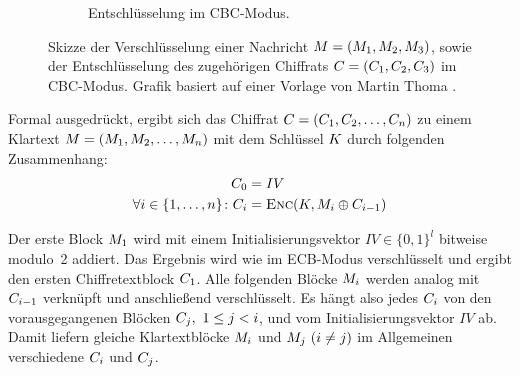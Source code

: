 \begin{figure}[h]
\begin{subfigure}[h]{.45\textwidth}
    \caption{Entschlüsselung im CBC-Modus.}
  \end{subfigure}
  \caption{Skizze der Verschlüsselung einer Nachricht $M =
    (M_{1},M_{2},M_{3})$, sowie der Entschlüsselung
    des zugehörigen Chiffrats $C =
    (C_{1},C_{2},C_{3})$ im CBC-Modus. Grafik
    basiert auf einer Vorlage von Martin Thoma \cite{Thoma2013}.} 
  \label{pc:cbc}
\end{figure}

Formal ausgedrückt, ergibt sich das Chiffrat $C =
(C_{1},C_{2},\dots,C_{n})$ zu einem Klartext
$M = (M_{1},M_{2},\dots,M_{n})$ mit dem
Schlüssel $K$ durch folgenden Zusammenhang: 
\begin{align*}
  C_0 &= IV\\
  \forall i \in \{1,\dots,n\}\colon C_i &= \textsc{Enc}(K, M_i \oplus C_{i-1})
\end{align*}

Der erste Block $M_1$ wird mit einem Initialisierungsvektor $IV
\in \{0,1\}^{l}$ \indexIV bitweise modulo~2 addiert. Das Ergebnis wird
wie im ECB-Modus verschlüsselt und ergibt den ersten Chiffretextblock
$C_1$. 
Alle folgenden Blöcke $M_i$ werden analog mit $C_{i-1}$
verknüpft und anschließend verschlüsselt. Es hängt also jedes
$C_i$ von den vorausgegangenen Blöcken $C_j,\ 1\leq j<i$,
und vom Initialisierungsvektor $IV$ ab. Damit liefern gleiche
Klartextblöcke $M_i$ und $M_j\ (i\neq j)$ im Allgemeinen
verschiedene $C_i$ und $C_j$. 

